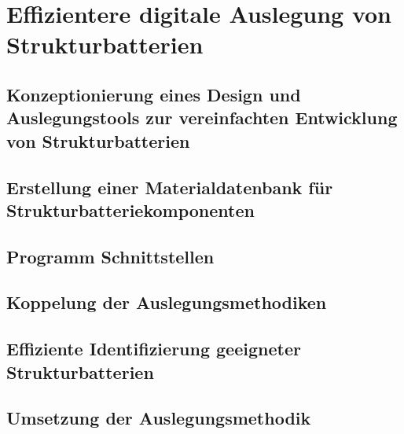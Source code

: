 \chapter{Effizientere digitale Auslegung von Strukturbatterien}
\section{Konzeptionierung eines Design und Auslegungstools zur vereinfachten Entwicklung von Strukturbatterien}

\section{Erstellung einer Materialdatenbank für Strukturbatteriekomponenten}

\section{Programm Schnittstellen}

\section{Koppelung der Auslegungsmethodiken}

\section{Effiziente Identifizierung geeigneter Strukturbatterien}

\section{Umsetzung der Auslegungsmethodik}

